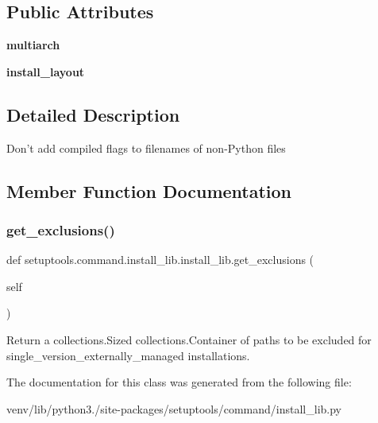 \subsection*{Public Attributes}
\begin{DoxyCompactItemize}
\item 
\mbox{\label{classsetuptools_1_1command_1_1install__lib_1_1install__lib_a09480b0dbbd49a28a627344f359537f9}} 
{\bfseries multiarch}
\item 
\mbox{\label{classsetuptools_1_1command_1_1install__lib_1_1install__lib_a8e3961beba26e37ba897e967076029bf}} 
{\bfseries install\+\_\+layout}
\end{DoxyCompactItemize}


\subsection{Detailed Description}
\begin{DoxyVerb}Don't add compiled flags to filenames of non-Python files\end{DoxyVerb}
 

\subsection{Member Function Documentation}
\mbox{\label{classsetuptools_1_1command_1_1install__lib_1_1install__lib_ac58d2f853233f9d3401b5f33617e5ac9}} 
\subsubsection{\texorpdfstring{get\+\_\+exclusions()}{get\_exclusions()}}
{\footnotesize\ttfamily def setuptools.\+command.\+install\+\_\+lib.\+install\+\_\+lib.\+get\+\_\+exclusions (\begin{DoxyParamCaption}\item[{}]{self }\end{DoxyParamCaption})}

\begin{DoxyVerb}Return a collections.Sized collections.Container of paths to be
excluded for single_version_externally_managed installations.
\end{DoxyVerb}
 

The documentation for this class was generated from the following file\+:\begin{DoxyCompactItemize}
\item 
venv/lib/python3./site-\/packages/setuptools/command/install\+\_\+lib.\+py\end{DoxyCompactItemize}

